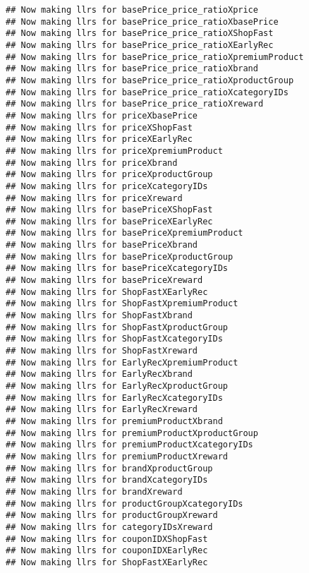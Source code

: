 \documentclass[10pt]{report}
\begin{document}
\begin{verbatim}
## Now making llrs for basePrice_price_ratioXprice
## Now making llrs for basePrice_price_ratioXbasePrice
## Now making llrs for basePrice_price_ratioXShopFast
## Now making llrs for basePrice_price_ratioXEarlyRec
## Now making llrs for basePrice_price_ratioXpremiumProduct
## Now making llrs for basePrice_price_ratioXbrand
## Now making llrs for basePrice_price_ratioXproductGroup
## Now making llrs for basePrice_price_ratioXcategoryIDs
## Now making llrs for basePrice_price_ratioXreward
## Now making llrs for priceXbasePrice
## Now making llrs for priceXShopFast
## Now making llrs for priceXEarlyRec
## Now making llrs for priceXpremiumProduct
## Now making llrs for priceXbrand
## Now making llrs for priceXproductGroup
## Now making llrs for priceXcategoryIDs
## Now making llrs for priceXreward
## Now making llrs for basePriceXShopFast
## Now making llrs for basePriceXEarlyRec
## Now making llrs for basePriceXpremiumProduct
## Now making llrs for basePriceXbrand
## Now making llrs for basePriceXproductGroup
## Now making llrs for basePriceXcategoryIDs
## Now making llrs for basePriceXreward
## Now making llrs for ShopFastXEarlyRec
## Now making llrs for ShopFastXpremiumProduct
## Now making llrs for ShopFastXbrand
## Now making llrs for ShopFastXproductGroup
## Now making llrs for ShopFastXcategoryIDs
## Now making llrs for ShopFastXreward
## Now making llrs for EarlyRecXpremiumProduct
## Now making llrs for EarlyRecXbrand
## Now making llrs for EarlyRecXproductGroup
## Now making llrs for EarlyRecXcategoryIDs
## Now making llrs for EarlyRecXreward
## Now making llrs for premiumProductXbrand
## Now making llrs for premiumProductXproductGroup
## Now making llrs for premiumProductXcategoryIDs
## Now making llrs for premiumProductXreward
## Now making llrs for brandXproductGroup
## Now making llrs for brandXcategoryIDs
## Now making llrs for brandXreward
## Now making llrs for productGroupXcategoryIDs
## Now making llrs for productGroupXreward
## Now making llrs for categoryIDsXreward
## Now making llrs for couponIDXShopFast
## Now making llrs for couponIDXEarlyRec
## Now making llrs for ShopFastXEarlyRec
\end{verbatim}
\end{document}
